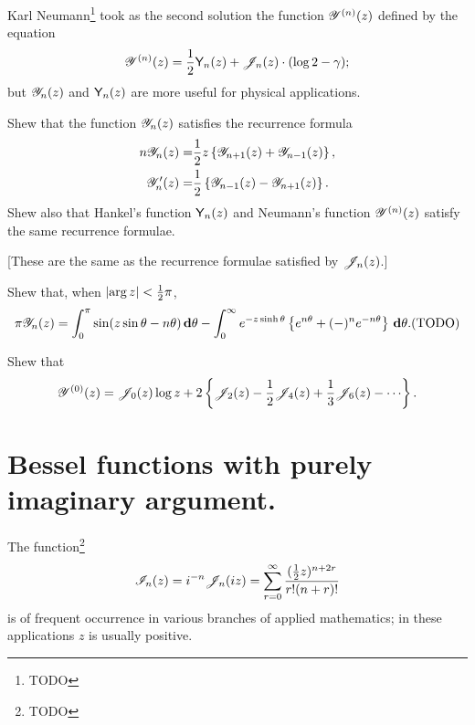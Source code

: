 \documentclass{book}
\begin{document}
Karl Neumann\footnote{TODO} took as the second solution the function
$\mathscr{Y}^{(n)}(z)$ defined by the equation
$$
\mathscr{Y}^{(n)}(z)
=
\frac{1}{2} \mathsf{Y}_n(z) + \mathscr{J}_n(z) \cdot (\log 2 - \gamma);
$$
but $\mathscr{Y}_n(z)$ and $\mathsf{Y}_n(z)$ are more useful for physical
applications.
\begin{wandwexample}
  Shew that the function $\mathscr{Y}_n(z)$ satisfies the recurrence formula
  \begin{align*}
    n \mathscr{Y}_n(z)
    =& \frac{1}{2} z \left\{  \mathscr{Y}_{n+1}(z) + \mathscr{Y}_{n-1}(z) \right\},
    \\
    \mathscr{Y}_n'(z)
    =& \frac{1}{2} \left\{  \mathscr{Y}_{n-1}(z) - \mathscr{Y}_{n+1}(z)   \right\}.
  \end{align*}
  Shew also that Hankel's function $\mathsf{Y}_n(z)$ and Neumann's
  function $\mathscr{Y}^{(n)}(z)$ satisfy the same recurrence formulae.

  [These are the same as the recurrence formulae satisfied by $\mathscr{J}_n(z)$.]
\end{wandwexample}
\begin{wandwexample}
  Shew that, when $\left| \arg z \right| < \frac{1}{2} \pi$,
  $$
  \pi \besY_n(z)
  =
  \int_0^{\pi}
  \sin (z \sin\theta - n\theta) \dmeasure \theta
  -
  \int_0^{\infty}
  e^{-z \sinh\theta} \thebrace{e^{n\theta} + (-)^n e^{-n\theta}} \dmeasure\theta.
  \addexamplecitation{TODO}
  $$
\end{wandwexample}
\begin{wandwexample}
  Shew that
  $$
  \besY^{(0)}(z)
  =
  \besJ_0(z) \log z
  + 2 \thebrace{ \besJ_2(z) - \half \besJ_4(z) + \frac{1}{3} \besJ_6(z) - \cdots  }.
  $$
\end{wandwexample}

\section{Bessel functions with purely imaginary argument.}
The function\footnote{TODO}
$$
\mathscr{I}_n(z)
=
i^{-n}
\mathscr{J}_n(iz)
=
\sum_{r=0}^{\infty}
\frac{(\frac{1}{2} z)^{n+2r}}{r!(n+r)!}
$$
% 
% 
is of frequent occurrence in various branches of applied
mathematics; in these applications $z$ is usually positive.
\end{document}
